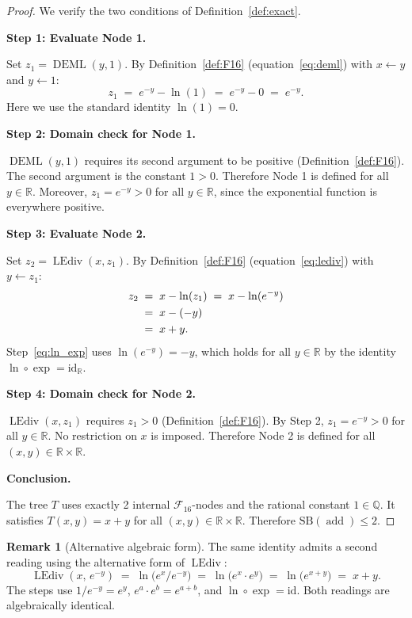 \documentclass[12pt,a4paper]{article}
\theoremstyle{definition}
\newtheorem{remark}[theorem]{Remark}
\newcommand{\DEML}{\operatorname{DEML}}
\newcommand{\LEdiv}{\operatorname{LEdiv}}
\newcommand{\addop}{\operatorname{add}}
\newcommand{\SB}{\mathrm{SB}}
\newcommand{\F}{\mathcal{F}_{16}}
\newcommand{\R}{\mathbb{R}}
\newcommand{\Q}{\mathbb{Q}}
\begin{document}
\begin{proof}
We verify the two conditions of Definition~\ref{def:exact}.

\medskip
\noindent\textbf{Step 1: Evaluate Node 1.}

Set $z_1 = \DEML(y, 1)$.
By Definition~\ref{def:F16} (equation~\eqref{eq:deml}) with $x \leftarrow y$
and $y \leftarrow 1$:
\begin{equation}
  z_1 \;=\; e^{-y} - \ln(1) \;=\; e^{-y} - 0 \;=\; e^{-y}.
  \label{eq:z1}
\end{equation}
Here we use the standard identity $\ln(1) = 0$.

\medskip
\noindent\textbf{Step 2: Domain check for Node 1.}

$\DEML(y, 1)$ requires its second argument to be positive (Definition~\ref{def:F16}).
The second argument is the constant $1 > 0$.
Therefore Node 1 is defined for all $y \in \R$.
Moreover, $z_1 = e^{-y} > 0$ for all $y \in \R$, since the exponential function
is everywhere positive.

\medskip
\noindent\textbf{Step 3: Evaluate Node 2.}

Set $z_2 = \LEdiv(x, z_1)$.
By Definition~\ref{def:F16} (equation~\eqref{eq:lediv}) with $y \leftarrow z_1$:
\begin{align}
  z_2 &\;=\; x - \ln(z_1)
             \;=\; x - \ln(e^{-y}) \notag \\
      &\;=\; x - (-y) \label{eq:ln_exp}\\
      &\;=\; x + y. \label{eq:z2}
\end{align}
Step~\eqref{eq:ln_exp} uses $\ln(e^{-y}) = -y$, which holds for all
$y \in \R$ by the identity $\ln \circ \exp = \mathrm{id}_\R$.

\medskip
\noindent\textbf{Step 4: Domain check for Node 2.}

$\LEdiv(x, z_1)$ requires $z_1 > 0$ (Definition~\ref{def:F16}).
By Step 2, $z_1 = e^{-y} > 0$ for all $y \in \R$.
No restriction on $x$ is imposed.
Therefore Node 2 is defined for all $(x, y) \in \R \times \R$.

\medskip
\noindent\textbf{Conclusion.}

The tree $T$ uses exactly 2 internal $\F$-nodes and the rational constant $1 \in \Q$.
It satisfies $T(x,y) = x + y$ for all $(x,y) \in \R \times \R$.
Therefore $\SB(\addop) \le 2$.
\end{proof}

\begin{remark}[Alternative algebraic form]
The same identity admits a second reading using the alternative form of $\LEdiv$:
\[
  \LEdiv(x,\, e^{-y})
  \;=\; \ln\!\bigl(e^x / e^{-y}\bigr)
  \;=\; \ln\!\bigl(e^x \cdot e^y\bigr)
  \;=\; \ln\!\bigl(e^{x+y}\bigr)
  \;=\; x + y.
\]
The steps use $1/e^{-y} = e^y$, $e^a \cdot e^b = e^{a+b}$, and
$\ln \circ \exp = \mathrm{id}$.
Both readings are algebraically identical.
\end{remark}
\end{document}
